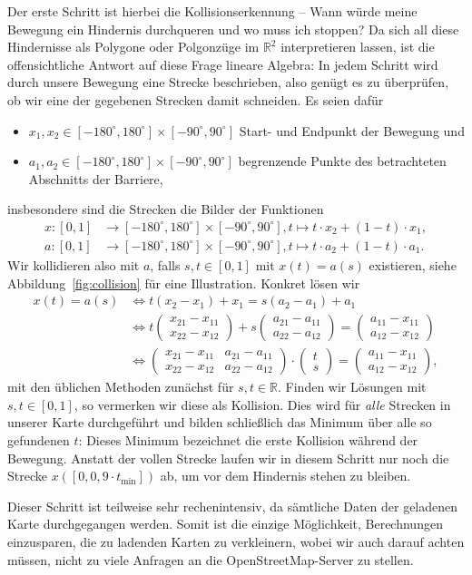 \documentclass[
    paper=a4,
    DIV14,
    fontsize=12pt,
    pagesize=pdftex,
    toc=bibliographynumbered
]{scrartcl}
\numberwithin{figure}{section}
\numberwithin{equation}{section}
\numberwithin{table}{section}
\newcommand*\setR{\mathds{R}}
\newcommand*\vecz[2]{\begin{pmatrix} #1 \\ #2 \end{pmatrix}}
\newcommand*\matDD[4]{\begin{pmatrix} #1 & #2 \\ #3 & #4 \end{pmatrix}}
\begin{document}
Der erste Schritt ist hierbei die Kollisionserkennung -- Wann würde meine Bewegung ein
Hindernis durchqueren und wo muss ich stoppen? Da sich all diese Hindernisse als Polygone
oder Polgonzüge im $\setR^2$ interpretieren lassen, ist die offensichtliche Antwort auf
diese Frage lineare Algebra: In jedem Schritt wird durch unsere Bewegung eine Strecke
beschrieben, also genügt es zu überprüfen, ob wir eine der gegebenen Strecken damit
schneiden. Es seien dafür
\begin{itemize}
    \item $x_1, x_2 \in [-180^\circ, 180^\circ]\times[-90^\circ, 90^\circ]$ Start- und
        Endpunkt der Bewegung und
    \item $a_1, a_2 \in [-180^\circ, 180^\circ]\times[-90^\circ, 90^\circ]$ begrenzende
        Punkte des betrachteten Abschnitts der Barriere,
\end{itemize}
insbesondere sind die Strecken die Bilder der Funktionen
\begin{align*}
    x:[0,1] &\to [-180^\circ, 180^\circ]\times[-90^\circ, 90^\circ],
    t \mapsto t\cdot x_2 + (1-t) \cdot x_1, \\
    a:[0,1] &\to [-180^\circ, 180^\circ]\times[-90^\circ, 90^\circ],
    t \mapsto t \cdot a_2 + (1-t) \cdot a_1.
\end{align*}
Wir kollidieren also mit $a$, falls $s,t \in [0,1]$ mit $x(t) = a(s)$ existieren, siehe
Abbildung~\ref{fig:collision} für eine Illustration. Konkret lösen wir
\begin{align*}
    x(t) = a(s) &\iff
    t(x_2 - x_1) + x_1 = s(a_2 - a_1) + a_1 \\
    &\iff
    t\vecz{x_{21}-x_{11}}{x_{22}-x_{12}}+s\vecz{a_{21}-a_{11}}{a_{22}- a_{12}}
    =\vecz{a_{11}-x_{11}}{a_{12}-x_{12}} \\
    &\iff
    \matDD{x_{21}-x_{11}}{a_{21}-a_{11}}{x_{22}-x_{12}}{a_{22}- a_{12}} \cdot
    \vecz ts =\vecz{a_{11}-x_{11}}{a_{12}-x_{12}},
\end{align*}
mit den üblichen Methoden zunächst für $s,t\in\setR$. Finden wir Lösungen mit
$s,t\in[0,1]$, so vermerken wir diese als Kollision. Dies wird für \emph{alle} Strecken in
unserer Karte durchgeführt und bilden schließlich das Minimum über alle so gefundenen
$t$: Dieses Minimum bezeichnet die erste Kollision während der Bewegung. Anstatt der
vollen Strecke laufen wir in diesem Schritt nur noch die Strecke $x([0, 0{,}9\cdot
t_{\min}])$ ab, um vor dem Hindernis stehen zu bleiben.

Dieser Schritt ist teilweise sehr rechenintensiv, da sämtliche Daten der geladenen Karte
durchgegangen werden. Somit ist die einzige Möglichkeit, Berechnungen einzusparen, die
zu ladenden Karten zu verkleinern, wobei wir auch darauf achten müssen, nicht zu viele
Anfragen an die OpenStreetMap-Server zu stellen.
\end{document}
